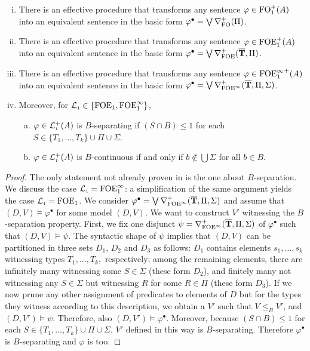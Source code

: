 \begin{theorem}  \label{th:onesteplogics-normalforms} %
\begin{enumerate}[(i)]
\item There is an effective procedure that transforms any sentence $\varphi \in \ofo^{+}(A)$ into an equivalent sentence in the basic form $\varphi^{\bullet} = \bigvee \posdbnfofo{\Pi}$.
\item There is an effective procedure that transforms any sentence $\varphi \in \ofoe^{+}(A)$ into an equivalent sentence in the basic form $\varphi^{\bullet} = \bigvee \posdbnfofoe{\vlist{T}}{\Pi}$.
\item There is an effective procedure that transforms any sentence $\varphi \in {\ofoei}^{+}(A)$ into an equivalent sentence in the basic form $\varphi^{\bullet} = \bigvee \mondbnfofoei{\vlist{T}}{\Pi}{\Sigma}{+}$.
\item Moreover, for $\llang \in \{ \ofoe, \ofoei\}$,
\begin{enumerate}[(a)]
\item $\varphi \in \llang^{+}(A)$ is $B$-separating if $(S \cap B) \leq 1$ for each $S \in \{T_1, \dots, T_k\} \cup \Pi \cup \Sigma$.\item $\varphi \in \llang^{+}(A)$ is $B$-continuous if and only if $b\notin \bigcup\Sigma$ for all $b \in B$.
\end{enumerate}
\end{enumerate}
\end{theorem}
\begin{proof}
The only statement not already proven in \cite{CFVZ-ModelTheoryPaper} is the one about $B$-separation. We discuss the case $\llang = \ofoei$: a simplification of the same argument yields the case $\llang = \ofoe$. We consider $\varphi^{\bullet} = \bigvee \mondbnfofoei{\vlist{T}}{\Pi}{\Sigma}{+}$ and assume that $(D,V) \models \varphi^{\bullet}$ for some model $(D,V)$. We want to construct $V'$ witnessing the $B$-separation property. First, we fix one disjunct $\psi = \mondbnfofoei{\vlist{T}}{\Pi}{\Sigma}{+}$ of $\varphi^{\bullet}$ such that $(D,V) \models \psi$. The syntactic shape of $\psi$ implies that
$(D,V)$ can be partitioned in three sets $D_1$, $D_2$ and $D_3$ as
follows: $D_1$ contains elements $s_1, \dots, s_k$ witnessing types
$T_1,\dots, T_k,$ respectively; among the remaining
elements, there are infinitely many witnessing some
$S\in \Sigma$ (these form $D_2$), and finitely many not witnessing
any $S \in \Sigma$ but witnessing $R$ for some $R \in \Pi$
(these form $D_3$). If we now prune any other assignment of
predicates to elements of $D$ but for the types they witness
according to this description, we obtain a $V'$ such that $V \leq_{B} V'$, and $(D,V') \models \psi$. Therefore, also $(D,V') \models \varphi^{\bullet}$. Moreover, because $(S \cap B) \leq 1$ for each $S \in \{T_1, \dots, T_k\} \cup \Pi \cup \Sigma$, $V'$ defined in this way is $B$-separating. Therefore $\varphi^{\bullet}$ is $B$-separating and $\varphi$ is too.
\end{proof}

